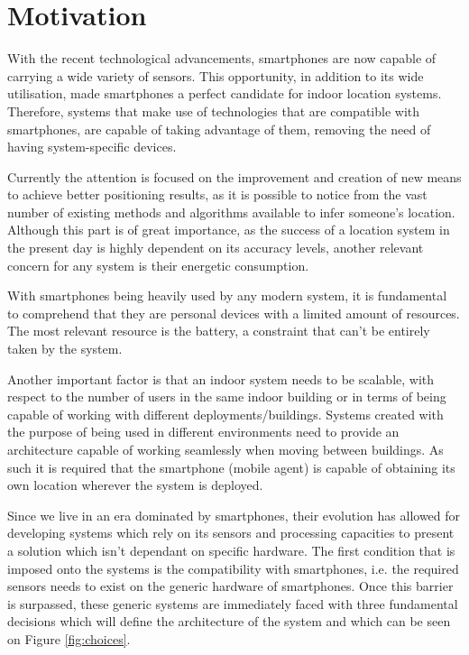 \section{Motivation} 
\label{sec:int_motivation} 
 
 
With the recent technological advancements, smartphones are now capable of carrying a wide variety of sensors. This opportunity, in addition to its wide utilisation, made smartphones a perfect candidate for indoor location systems. Therefore, systems that make use of technologies that are compatible with smartphones, are capable of taking advantage of them, removing the need of having system-specific devices. 
 
Currently the attention is focused on the improvement and creation of new means to achieve better positioning results, as it is possible to notice from the vast number of existing methods and algorithms available to infer someone's location. Although this part is of great importance, as the success of a location system in the present day is highly dependent on its accuracy levels, another relevant concern for any system is their energetic consumption.

With smartphones being heavily used by any modern system, it is fundamental to comprehend that they are personal devices with a limited amount of resources. The most relevant resource is the battery, a constraint that can't be entirely taken by the system.  
 
Another important factor is that an indoor system needs to be scalable, with respect to the number of users in the same indoor building or in terms of being capable of working with different deployments/buildings. Systems created with the purpose of being used in different environments need to provide an architecture capable of working seamlessly when moving between buildings. As such it is required that the smartphone (mobile agent) is capable of obtaining its own location wherever the system is deployed.   
 
Since we live in an era dominated by smartphones, their evolution has allowed for developing systems which rely on its sensors and processing capacities to present a solution which isn't dependant on specific hardware. The first condition that is imposed onto the systems is the compatibility with smartphones, i.e. the required sensors needs to exist on the generic hardware of smartphones. Once this barrier is surpassed, these generic systems are immediately faced with three fundamental decisions which will define the architecture of the system and which can be seen on Figure \ref{fig:choices}. 
 
